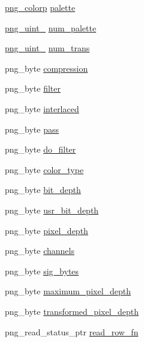 \begin{DoxyCompactItemize}
\item 
\hyperlink{png_8h_a0fffc4de82c4f4a2211026316653b03c}{png\+\_\+colorp} \hyperlink{structpng__struct__def_ae79416e3df9e02b8a17eac57f91b6fc0}{palette}
\item 
\hyperlink{pngrutil_8c_a7b67546e4211b127dd370e8ef197bc3f}{png\+\_\+uint\+\_} \hyperlink{structpng__struct__def_a55dc88ce7229269ae06c498e63a00ccc}{num\+\_\+palette}
\item 
\hyperlink{pngrutil_8c_a7b67546e4211b127dd370e8ef197bc3f}{png\+\_\+uint\+\_} \hyperlink{structpng__struct__def_a3988e717574b747396cb156e29895cb0}{num\+\_\+trans}
\item 
png\+\_\+byte \hyperlink{structpng__struct__def_a535707a3578321703642be999866f131}{compression}
\item 
png\+\_\+byte \hyperlink{structpng__struct__def_a4680ad260ea37a0b69677ff537b1c8b1}{filter}
\item 
png\+\_\+byte \hyperlink{structpng__struct__def_ac57d1535c25726a4080f4f471dbb7e17}{interlaced}
\item 
png\+\_\+byte \hyperlink{structpng__struct__def_a61226f1790d295a85fdd0ca8c195469c}{pass}
\item 
png\+\_\+byte \hyperlink{structpng__struct__def_abcbabd6f1568b3924af91556371d7b73}{do\+\_\+filter}
\item 
png\+\_\+byte \hyperlink{structpng__struct__def_a01e64966deb22a659cce371cbf6af666}{color\+\_\+type}
\item 
png\+\_\+byte \hyperlink{structpng__struct__def_a8a18c35f00b4dff31c12306156f01ce3}{bit\+\_\+depth}
\item 
png\+\_\+byte \hyperlink{structpng__struct__def_af30e53e1cad0830302030152c81cc59f}{usr\+\_\+bit\+\_\+depth}
\item 
png\+\_\+byte \hyperlink{structpng__struct__def_ac7a7265bc00d1fd48a8eb20727f53fa1}{pixel\+\_\+depth}
\item 
png\+\_\+byte \hyperlink{structpng__struct__def_a6cc1ac2587b192b7220639ab719f2b73}{channels}
\item 
png\+\_\+byte \hyperlink{structpng__struct__def_a019243f63de45bd677d23f8ed533679d}{sig\+\_\+bytes}
\item 
png\+\_\+byte \hyperlink{structpng__struct__def_aab7b84c6ccac540be5df26a81654a009}{maximum\+\_\+pixel\+\_\+depth}
\item 
png\+\_\+byte \hyperlink{structpng__struct__def_aa4e37c14d96c7057389a7cb2ca839290}{transformed\+\_\+pixel\+\_\+depth}
\item 
png\+\_\+read\+\_\+status\+\_\+ptr \hyperlink{structpng__struct__def_a0d67c044d4088f4673b90c2109ff94c0}{read\+\_\+row\+\_\+fn}

\end{DoxyCompactItemize}
